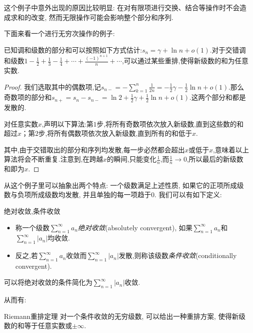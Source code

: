 这个例子中意外出现的原因比较明显: 在对有限项进行交换、结合等操作时不会造成求和的改变, 然而无限操作可能会影响整个部分和序列. 

下面来看一个进行无穷次操作的例子:

\begin{example}
	已知调和级数的部分和可以按照如下方式估计:$s_n=\gamma + \ln n + o(1)$.对于交错调和级数$1-\frac{1}{2}+\frac{1}{3}-\frac{1}{4}+\cdots + \frac{(-1)^{n+1}}{n}+\cdots $,可以通过某些重排,使得新级数的和为任意实数.
\end{example}
\begin{proof}
	我们选取其中的偶数项,记$s_{n-}=-\sum_{k=1}^{n} \frac{1}{2n} = -\frac{1}{2}\gamma -\frac{1}{2}\ln n+o(1)$.那么奇数项的部分和$s_{n+}=s_n-s_{n-}=\ln 2+\frac{1}{2}\gamma + \frac{1}{2}\ln n + o(1)$.这两个部分和都是发散的.
	
	对任意实数$x$,声明以下算法:第$1$步,将所有奇数项依次放入新级数,直到这些数的和超过$x$；第$2$步,将所有偶数项依次放入新级数,直到所有的和低于$x$.
	
	其中,由于交错取出的部分和序列均发散,每一步必然都会超出$x$或低于$x$,意味着以上算法将会不断重复.注意到,在跨越$x$的瞬间,只能变化$\frac{1}{n}$,而$\frac{1}{n} \to 0$,所以最后的新级数和即为$x$.
\end{proof}

从这个例子里可以抽象出两个特点: 一个级数满足上述性质, 如果它的正项所成级数与负项所成级数均发散, 并且单独的每一项趋于$0$. 我们可以有如下定义: 

\begin{definition}{绝对收敛,条件收敛}
	\vspace{-2em}
	\begin{itemize}
		\item 称一个级数$\sum_{n=1}^{\infty} a_n$\textit{绝对收敛}(absolutely convergent), 如果$\sum_{n=1}^{\infty} a_n$和$\sum_{n=1}^{\infty} |a_n|$均收敛. 
		\item 反之,若$\sum_{n=1}^{\infty} a_n$收敛而$\sum_{n=1}^{\infty} |a_n|$发散,则称该级数\textit{条件收敛}(conditionally convergent). 
	\end{itemize}
\end{definition}
\begin{remark}
	可以将绝对收敛的条件简化为$\sum_{n=1}^{\infty} |a_n|$收敛.
\end{remark}

从而有:

\begin{theorem}{Riemann重排定理}
	对一个条件收敛的无穷级数, 可以给出一种重排方案, 使得新级数的和等于任意实数或$\pm \infty$. 
\end{theorem}

